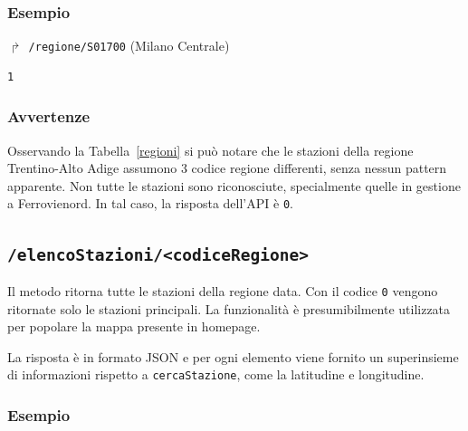 \documentclass[12pt,italian]{report}
\begin{document}
\subsubsection{Esempio}

$\Rsh$ \texttt{/regione/S01700} \hfill (Milano Centrale)
\begin{verbatim}
1
\end{verbatim}

\subsubsection{Avvertenze}

Osservando la Tabella~\ref{regioni} si può notare che le stazioni
della regione Trentino-Alto Adige assumono 3 codice regione
differenti, senza nessun pattern apparente.  Non tutte le stazioni
sono riconosciute, specialmente quelle in gestione a Ferrovienord.  In
tal caso, la risposta dell'API è \texttt{0}.

\subsection{\texttt{/elencoStazioni/<codiceRegione>}}
\label{elencoStazioni}

Il metodo ritorna tutte le stazioni della regione data.  Con il codice
\texttt{0} vengono ritornate solo le stazioni principali.  La
funzionalità è presumibilmente utilizzata per popolare la mappa
presente in homepage.

La risposta è in formato JSON e per ogni elemento viene fornito un
superinsieme di informazioni rispetto a \texttt{cercaStazione}, come
la latitudine e longitudine.

\subsubsection{Esempio}
\end{document}
